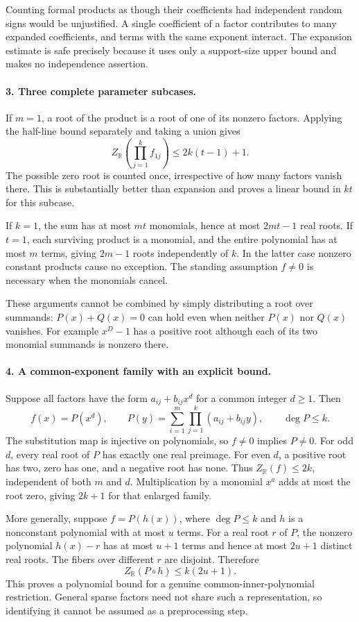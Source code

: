 \documentclass[11pt]{article}
\begin{document}
Counting formal products as though their coefficients had independent random signs would be unjustified. A single coefficient of a factor contributes to many expanded coefficients, and terms with the same exponent interact. The expansion estimate is safe precisely because it uses only a support-size upper bound and makes no independence assertion.

\paragraph{3. Three complete parameter subcases.}
If $m=1$, a root of the product is a root of one of its nonzero factors. Applying the half-line bound separately and taking a union gives
\[
 Z_{\mathbb R}\left(\prod_{j=1}^k f_{1j}\right)
 \le 2k(t-1)+1.
\]
The possible zero root is counted once, irrespective of how many factors vanish there. This is substantially better than expansion and proves a linear bound in $kt$ for this subcase.

If $k=1$, the sum has at most $mt$ monomials, hence at most $2mt-1$ real roots. If $t=1$, each surviving product is a monomial, and the entire polynomial has at most $m$ terms, giving $2m-1$ roots independently of $k$. In the latter case nonzero constant products cause no exception. The standing assumption $f\ne0$ is necessary when the monomials cancel.

These arguments cannot be combined by simply distributing a root over summands: $P(x)+Q(x)=0$ can hold even when neither $P(x)$ nor $Q(x)$ vanishes. For example $x^D-1$ has a positive root although each of its two monomial summands is nonzero there.

\paragraph{4. A common-exponent family with an explicit bound.}
Suppose all factors have the form $a_{ij}+b_{ij}x^d$ for a common integer $d\ge1$. Then
\[
 f(x)=P(x^d),\qquad
 P(y)=\sum_{i=1}^m\prod_{j=1}^k(a_{ij}+b_{ij}y),
 \qquad \deg P\le k.
\]
The substitution map is injective on polynomials, so $f\ne0$ implies $P\ne0$. For odd $d$, every real root of $P$ has exactly one real preimage. For even $d$, a positive root has two, zero has one, and a negative root has none. Thus $Z_{\mathbb R}(f)\le2k$, independent of both $m$ and $d$. Multiplication by a monomial $x^a$ adds at most the root zero, giving $2k+1$ for that enlarged family.

More generally, suppose $f=P(h(x))$, where $\deg P\le k$ and $h$ is a nonconstant polynomial with at most $u$ terms. For a real root $r$ of $P$, the nonzero polynomial $h(x)-r$ has at most $u+1$ terms and hence at most $2u+1$ distinct real roots. The fibers over different $r$ are disjoint. Therefore
\[
 Z_{\mathbb R}(P\circ h)\le k(2u+1).
\]
This proves a polynomial bound for a genuine common-inner-polynomial restriction. General sparse factors need not share such a representation, so identifying it cannot be assumed as a preprocessing step.
\end{document}
